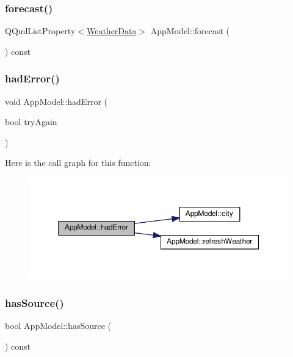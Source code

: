\subsubsection{\texorpdfstring{forecast()}{forecast()}}
{\footnotesize\ttfamily Q\+Qml\+List\+Property$<$\hyperlink{class_weather_data}{Weather\+Data}$>$ App\+Model\+::forecast (\begin{DoxyParamCaption}{ }\end{DoxyParamCaption}) const}

\mbox{\label{class_app_model_ac5fe590924b727724d9c686bb2552ed8}} 
\subsubsection{\texorpdfstring{had\+Error()}{hadError()}}
{\footnotesize\ttfamily void App\+Model\+::had\+Error (\begin{DoxyParamCaption}\item[{bool}]{try\+Again }\end{DoxyParamCaption})}

Here is the call graph for this function\+:\nopagebreak
\begin{figure}[H]
\begin{center}
\leavevmode
\includegraphics[width=350pt]{class_app_model_ac5fe590924b727724d9c686bb2552ed8_cgraph}
\end{center}
\end{figure}
\mbox{\label{class_app_model_a8ad68e982b0a307d9986ff538baedbd2}} 
\subsubsection{\texorpdfstring{has\+Source()}{hasSource()}}
{\footnotesize\ttfamily bool App\+Model\+::has\+Source (\begin{DoxyParamCaption}{ }\end{DoxyParamCaption}) const}

